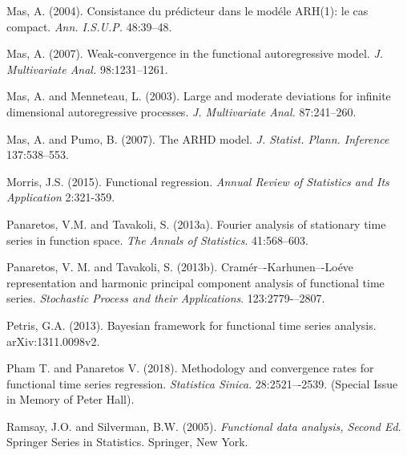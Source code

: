 \documentclass[11pt,a4paper]{article}
\begin{document}
\begin{thebibliography}{9}
Mas,  A. (2004).	
	Consistance du pr\'edicteur dans le mod\'ele {ARH}(1): le cas compact.
	\emph{Ann. I.S.U.P.} 48:39--48.
	
	Mas,  A. (2007).	
	Weak-convergence in the functional autoregressive model.
	\emph{J. Multivariate Anal.}  98:1231--1261.

Mas,  A. and Menneteau, L. (2003). Large and moderate deviations for infinite dimensional autoregressive processes.
	\emph{J. Multivariate Anal.}  87:241--260.
	
 Mas,  A. and  Pumo, B. (2007).
	The {ARHD} model.
	\emph{J. Statist. Plann. Inference}
	137:538--553.
	






Morris, J.S. (2015). Functional regression. \emph{Annual Review of Statistics and Its Application} 2:321-359.

Panaretos, V.M. and Tavakoli, S. (2013a). Fourier analysis of stationary time series in function space. \emph{The Annals of Statistics}. 41:568--603.


Panaretos, V. M. and Tavakoli, S. (2013b). Cram\'er–-Karhunen–-Lo\'eve representation and harmonic principal component analysis of functional time series. \emph{Stochastic Process and their Applications}. 123:2779-–2807.

 Petris,  G.A.  (2013). {B}ayesian framework for functional time series analysis.
	arXiv:1311.0098v2.
	
Pham T. and  Panaretos V. (2018). Methodology and convergence rates for functional time series regression. \emph{Statistica Sinica}. 28:2521–-2539. (Special Issue in Memory of Peter Hall).

Ramsay, J.O. and  Silverman, B.W. (2005). \emph{Functional data analysis, Second Ed}. Springer Series in Statistics. Springer, New York.


\end{thebibliography}
\end{document}
